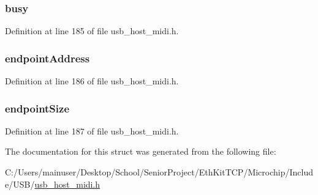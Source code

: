\subsubsection[{busy}]{ busy}\label{struct_m_i_d_i___e_n_d_p_o_i_n_t___d_a_t_a_a70f231df37533cb38517a4c232d3ea36}


Definition at line 185 of file usb\+\_\+host\+\_\+midi.\+h.

\hypertarget{struct_m_i_d_i___e_n_d_p_o_i_n_t___d_a_t_a_a6c0560f3ba69f753f9dd2b88cbce1f4f}{}
\subsubsection[{endpoint\+Address}]{ endpoint\+Address}\label{struct_m_i_d_i___e_n_d_p_o_i_n_t___d_a_t_a_a6c0560f3ba69f753f9dd2b88cbce1f4f}


Definition at line 186 of file usb\+\_\+host\+\_\+midi.\+h.

\hypertarget{struct_m_i_d_i___e_n_d_p_o_i_n_t___d_a_t_a_a741c25067a940ada7a600e4c7fb55d44}{}
\subsubsection[{endpoint\+Size}]{ endpoint\+Size}\label{struct_m_i_d_i___e_n_d_p_o_i_n_t___d_a_t_a_a741c25067a940ada7a600e4c7fb55d44}


Definition at line 187 of file usb\+\_\+host\+\_\+midi.\+h.



The documentation for this struct was generated from the following file\+:\begin{DoxyCompactItemize}
\item 
C\+:/\+Users/mainuser/\+Desktop/\+School/\+Senior\+Project/\+Eth\+Kit\+T\+C\+P/\+Microchip/\+Include/\+U\+S\+B/\hyperlink{usb__host__midi_8h}{usb\+\_\+host\+\_\+midi.\+h}\end{DoxyCompactItemize}
